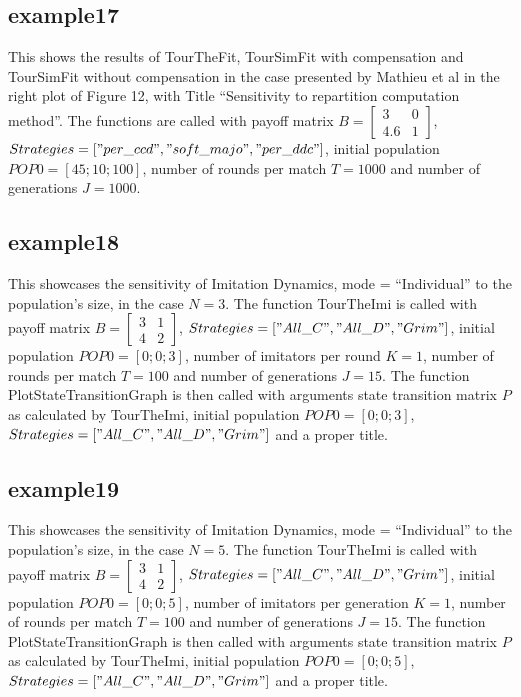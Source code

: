 \subsection{example17}
This shows the results of TourTheFit, TourSimFit with compensation and TourSimFit without compensation in the case presented by Mathieu et al in the right plot of Figure 12, with Title ``Sensitivity to repartition computation method''. The functions are called with payoff matrix $B = \begin{bmatrix} 3 & 0 \\ 4.6 & 1 \end{bmatrix}$, $Strategies = ["per\_ccd", "soft\_majo", "per\_ddc"]$, initial population $POP0 = [45; 10; 100]$, number of rounds per match $T = 1000$ and number of generations $J = 1000$.

\subsection{example18}
This showcases the sensitivity of Imitation Dynamics, mode = ``Individual'' to the population's size, in the case $N=3$. The function TourTheImi is called with payoff matrix $B = \begin{bmatrix} 3 & 1 \\ 4 & 2 \end{bmatrix}$, $Strategies = ["All\_C", "All\_D", "Grim"]$, initial population $POP0 = [0; 0; 3]$, number of imitators per round $K=1$, number of rounds per match $T = 100$ and number of generations $J = 15$. The function PlotStateTransitionGraph is then called with arguments state transition matrix $P$ as calculated by TourTheImi, initial population $POP0 = [0; 0; 3]$, $Strategies = ["All\_C", "All\_D", "Grim"]$ and a proper title.

\subsection{example19}
This showcases the sensitivity of Imitation Dynamics, mode = ``Individual'' to the population's size, in the case $N=5$. The function TourTheImi is called with payoff matrix $B = \begin{bmatrix} 3 & 1 \\ 4 & 2 \end{bmatrix}$, $Strategies = ["All\_C", "All\_D", "Grim"]$, initial population $POP0 = [0; 0; 5]$, number of imitators per generation $K=1$, number of rounds per match $T = 100$ and number of generations $J = 15$. The function PlotStateTransitionGraph is then called with arguments state transition matrix $P$ as calculated by TourTheImi, initial population $POP0 = [0; 0; 5]$, $Strategies = ["All\_C", "All\_D", "Grim"]$ and a proper title.

